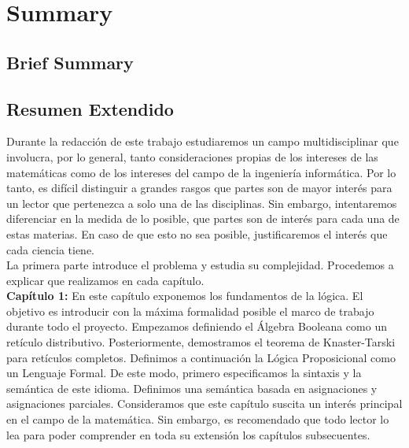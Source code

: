 
\newpage



\chapter*{Summary}
\section*{Brief Summary}



\section*{Resumen Extendido}

Durante la redacción de este trabajo estudiaremos un campo multidisciplinar que involucra, por lo general, tanto consideraciones propias de los intereses de las matemáticas como de los intereses del campo de la ingeniería informática. Por lo tanto, es difícil distinguir a grandes rasgos que partes son de mayor interés para un lector que pertenezca a solo una de las disciplinas. Sin embargo, intentaremos diferenciar en la medida de lo posible, que partes son de interés para cada una de estas materias. En caso de que esto no sea posible, justificaremos el interés que cada ciencia tiene.\\

La primera parte introduce el problema y estudia su complejidad. Procedemos a explicar que realizamos en cada capítulo.\\

\textbf{Capítulo 1:} En este capítulo exponemos los fundamentos de la lógica. El objetivo es introducir con la máxima formalidad posible el marco de trabajo durante todo el proyecto. 
Empezamos definiendo el Álgebra Booleana como un retículo distributivo. Posteriormente, demostramos el teorema de Knaster-Tarski para retículos completos. Definimos a continuación la Lógica Proposicional como un Lenguaje Formal. De este modo, primero especificamos la sintaxis y la semántica de este idioma. Definimos una semántica basada en asignaciones y asignaciones parciales. Consideramos que este capítulo suscita un interés principal en el campo de la matemática. Sin embargo, es recomendado que todo lector lo lea para poder comprender en toda su extensión los capítulos subsecuentes.\\

